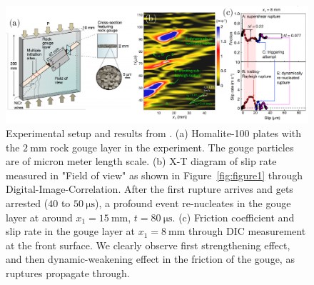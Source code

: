 \documentclass[final,a4paper]{elsarticle}
\begin{document}
\begin{figure}[htbp]
    \centering
    \includegraphics[width=1.\textwidth]{figures/figure_exp_0327.pdf}
    \caption{Experimental setup and results from \cite{Rubino2022}. 
    (a) Homalite-100 plates with the $2\ \mathrm{mm}$ rock gouge layer in the experiment. The gouge particles are of micron meter length scale.
    (b) X-T diagram of slip rate measured in "Field of view" as shown in Figure~\ref{fig:figure1} through Digital-Image-Correlation. 
    After the first rupture arrives and gets arrested ($40$ to $50\ \mathrm{\mu s}$), 
    a profound event re-nucleates in the gouge layer at around $x_1 = 15\ \mathrm{mm}$, $t = 80\ \mathrm{\mu s}$. 
    (c) Friction coefficient and slip rate in the gouge layer at $x_1 = 8 \ \mathrm{mm}$ through DIC measurement at the front surface. 
    We clearly observe first strengthening effect,
    and then dynamic-weakening effect in the friction of the gouge,
    as ruptures propagate through.} 
    \label{fig:figureExp}
\end{figure}
\end{document}
